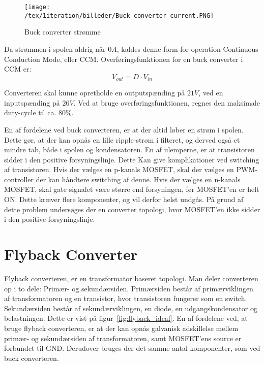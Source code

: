 \begin{figure}[H]
	\center
	\texttt{[image: /tex/1iteration/billeder/Buck\_converter\_current.PNG]}
	\caption{Buck converter strømme
		\cite{buck-converter}}
	\label{fig:buck_converter_current}
\end{figure}


Da strømmen i spolen aldrig når $0A$, kaldes denne form for operation Continuous Conduction Mode, eller CCM. Overføringsfunktionen for en buck converter i CCM er\cite{SMPS-topologies}:
\begin{equation} \label{buck_converter_overforinsfunktion}
V_{out} = D\cdot V_{in}
\end{equation}

Converteren skal kunne opretholde en outputspænding på $21V$, ved en inputspænding på $26V$. Ved at bruge overføringsfunktionen, regnes den maksimale duty-cycle til ca. $80\percent$. 

En af fordelene ved buck converteren, er at der altid løber en strøm i spolen. Dette gør, at der kan opnås en lille ripple-strøm i filteret, og derved også et mindre tab, både i spolen og kondensatoren. 
En af ulemperne, er at transistoren sidder i den positive forsyningslinje. Dette Kan give komplikationer ved switching af transistoren. Hvis der vælges en p-kanals MOSFET, skal der vælges en PWM-controller der kan håndtere switching af denne. Hvis der vælges en n-kanals MOSFET, skal gate signalet være større end forsyningen, før MOSFET'en er helt ON. Dette kræver flere komponenter, og vil derfor helst undgås. På grund af dette problem undersøges der en converter topologi, hvor MOSFET'en ikke sidder i den positive forsyningslinje.

\section{Flyback Converter}
Flyback converteren, er en transformator baseret topologi. Man deler converteren op i to dele: Primær- og sekundærsiden. Primærsiden består af primærviklingen af transformatoren og en transistor, hvor transistoren fungerer som en switch. Sekundærsiden består af sekundærviklingen, en diode, en udgangskondensator og belastningen. Dette er vist på figur~\ref{fig:flyback_ideal}. En af fordelene ved, at bruge flyback converteren, er at der kan opnås galvanisk adskillelse mellem primær- og sekundærsiden af transformatoren, samt MOSFET'ens source er forbundet til GND. Derudover bruges der det samme antal komponenter, som ved buck converteren.

